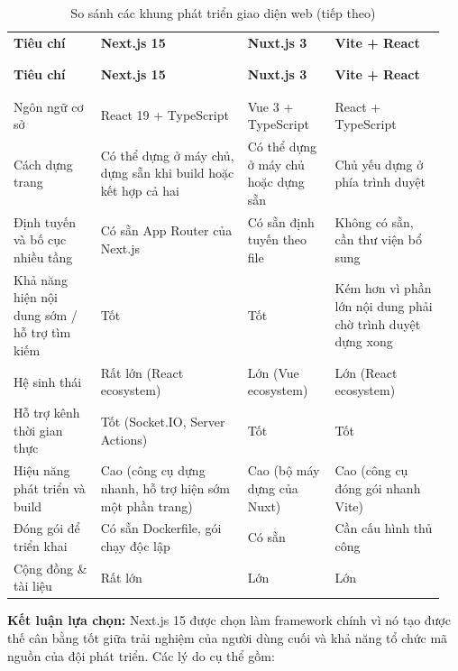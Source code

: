 \documentclass[a4paper]{extarticle}
\newcommand{\thesissettableid}[2]{%
  \renewcommand{\thetable}{#1}%
  \renewcommand{\theHtable}{#2}%
}
\begin{document}
{\thesissettableid{3.24}{tab-ch3-so-sanh-framework-frontend}
\def\LTcaptype{table}
\begin{longtable}{|L{0.195\linewidth}|L{0.323\linewidth}|L{0.192\linewidth}|L{0.244\linewidth}|}
\caption{So sánh các khung phát triển giao diện web}\label{tab:ch3-so-sanh-framework-frontend}\\
\hline \textbf{Tiêu chí} & \textbf{Next.js 15} & \textbf{Nuxt.js 3} & \textbf{Vite + React} \\
\\\hline
\endfirsthead
\caption[]{So sánh các khung phát triển giao diện web (tiếp theo)}\\
\hline \textbf{Tiêu chí} & \textbf{Next.js 15} & \textbf{Nuxt.js 3} & \textbf{Vite + React} \\
\\\hline
\endhead
\\\hline
\endfoot
\endlastfoot
Ngôn ngữ cơ sở & React 19 + TypeScript & Vue 3 + TypeScript & React +
TypeScript \\\hline
Cách dựng trang & Có thể dựng ở máy chủ, dựng sẵn khi build hoặc kết
hợp cả hai & Có thể dựng ở máy chủ hoặc dựng sẵn & Chủ yếu dựng ở phía
trình duyệt \\\hline
Định tuyến và bố cục nhiều tầng & Có sẵn App Router của Next.js & Có sẵn
định tuyến theo file & Không có sẵn, cần thư viện bổ sung \\\hline
Khả năng hiện nội dung sớm / hỗ trợ tìm kiếm & Tốt & Tốt & Kém hơn vì
phần lớn nội dung phải chờ trình duyệt dựng xong \\\hline
Hệ sinh thái & Rất lớn (React ecosystem) & Lớn (Vue ecosystem) & Lớn
(React ecosystem) \\\hline
Hỗ trợ kênh thời gian thực & Tốt (Socket.IO, Server Actions) & Tốt & Tốt \\\hline
Hiệu năng phát triển và build & Cao (công cụ dựng nhanh, hỗ trợ hiện sớm một phần trang) & Cao (bộ máy dựng của Nuxt) &
Cao (công cụ đóng gói nhanh Vite) \\\hline
Đóng gói để triển khai & Có sẵn Dockerfile, gói chạy độc lập & Có sẵn & Cần
cấu hình thủ công \\\hline
Cộng đồng \& tài liệu & Rất lớn & Lớn & Lớn \\\hline
\end{longtable}
}


\textbf{Kết luận lựa chọn:} Next.js 15 được chọn làm framework chính vì
nó tạo được thế cân bằng tốt giữa trải nghiệm của người dùng cuối và khả
năng tổ chức mã nguồn của đội phát triển. Các lý do cụ thể gồm:
\end{document}
